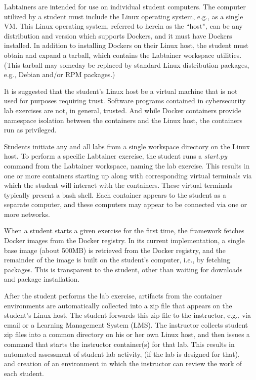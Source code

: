 \documentclass[12pt]{article}
\begin{document}
Labtainers are intended for use on individual student computers.
The computer utilized by a student must include the Linux operating system, e.g.,
as a single VM.  This Linux operating system, referred to herein
as the ``host'', can be any distribution and version
which supports Dockers, and it must have Dockers installed.  
In addition to installing Dockers on their Linux host, the student must
obtain and expand a tarball, which contains the Labtainer workspace utilities.
(This tarball may someday be replaced by standard Linux distribution packages,
e.g., Debian and/or RPM packages.)  

It is suggested that the student's Linux host be a virtual machine that is
not used for purposes requiring trust.  Software programs contained in cybersecurity lab
exercises are not, in general, trusted.  And while Docker containers provide namespace
isolation between the containers and the Linux host, the containers run as privileged.

Students initiate any and all labs from a
single workspace directory on the Linux host.
To perform a specific Labtainer exercise, the student runs a \textit{start.py} command from
the Labtainer workspace, naming the lab exercise.  This results in one or more
containers starting up along with corresponding virtual terminals via which the 
student will interact with the containers.  These virtual terminals typically
present a bash shell.  Each container appears to the student as a separate
computer, and these computers may appear to be connected via one or more networks.  

When a student starts a given exercise for the first time, the framework fetches
Docker images from the Docker registry.  In its current implementation, a single
base image (about 500MB) is retrieved from the Docker registry, and the remainder of the image
is built on the student's computer, i.e., by fetching packages. This is transparent to
the student, other than waiting for downloads and package installation. 

After the student performs the lab exercise, artifacts from the container
environments are automatically collected into a zip file that appears on
the student's Linux host.  The student forwards this zip file to the instructor,
e.g., via email or a Learning Management System (LMS).  The instructor collects student zip files into a common
directory on his or her own Linux host, and then issues a command that starts
the instructor container(s) for that lab.  This results in automated assessment of student lab
activity, (if the lab is designed for that), and creation of an environment
in which the instructor can review the work of each student.
\end{document}
